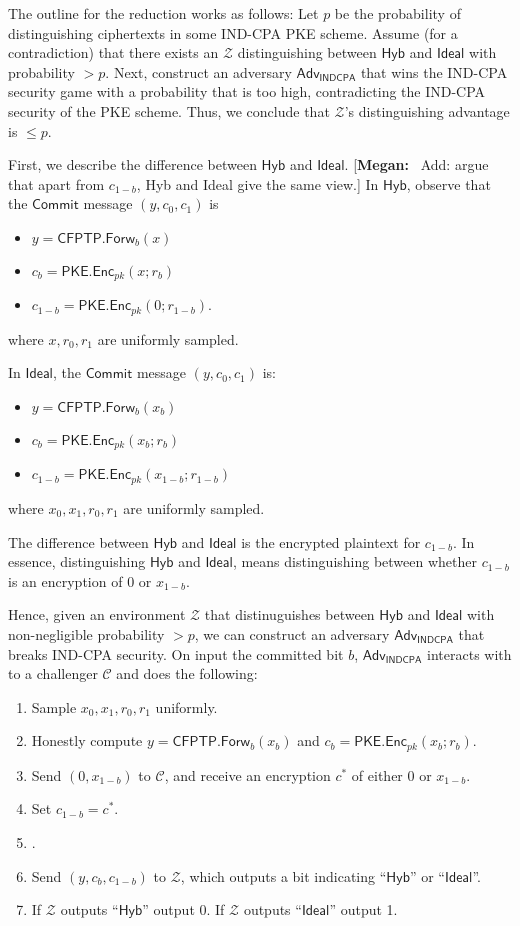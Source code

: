 \documentclass{article}[12pt]
\newcommand{\authnote}[2]{[{\color{red}\textbf{#1:}}~{\color{blue} #2}]}
\newcommand{\authnote}[2]{}
\newcommand{\megan}[1]{\authnote{Megan}{#1}}
\newcommand{\OpenMsg}{\mathsf{Open}}
\newcommand{\CommitMsg}{\mathsf{Commit}}
\newcommand{\PKE}{\mathsf{PKE}}
\newcommand{\Enc}{\mathsf{Enc}}
\newcommand{\Indcpa}{\mathsf{INDCPA}}
\newcommand{\IndcpaGM}{\mathcal{C}} %
\newcommand{\CFPTP}{\mathsf{CFPTP}}
\newcommand{\Forw}{\mathsf{Forw}}
\newcommand{\Adversary}{{\mathsf{Adv}}} %
\newcommand{\Environment}{{\mathcal{Z}}} %
\newcommand{\IndcpaAdversary}{{\Adversary_\Indcpa}}
\newcommand{\Ideal}{{\mathsf{Ideal}}}
\newcommand{\Hyb}{{\mathsf{Hyb}}}
\begin{document}
The outline for the reduction works as follows: Let $p$ be the probability of distinguishing ciphertexts in some IND-CPA PKE scheme. Assume (for a contradiction) that there exists an $\Environment$ distinguishing between $\Hyb$ and $\Ideal$ with probability $> p$. Next, construct an adversary $\IndcpaAdversary$ that wins the IND-CPA security game with a probability that is too high, contradicting the IND-CPA security of the PKE scheme. Thus, we conclude that $\Environment$'s distinguishing advantage is $\leq p$.

First, we describe the difference between $\Hyb$ and $\Ideal$. \megan{Add: argue that apart from $c_{1-b}$, Hyb and Ideal give the same view.}
In $\Hyb$, observe that the $\CommitMsg$ message $(y, c_0, c_1)$ is
\begin{itemize}
	\item $y = \CFPTP.\Forw_{b}(x)$
	\item $c_b = \PKE.\Enc_{pk}(x; r_b)$
	\item $c_{1-b} = \PKE.\Enc_{pk}(0; r_{1-b})$.
\end{itemize}
where $x, r_0, r_1$ are uniformly sampled.

In $\Ideal$, the $\CommitMsg$ message $(y, c_0, c_1)$ is:
\begin{itemize}
	\item $y = \CFPTP.\Forw_{b}(x_b)$
	\item $c_b = \PKE.\Enc_{pk}(x_b; r_b)$
	\item $c_{1-b} = \PKE.\Enc_{pk}(x_{1-b}; r_{1-b})$
\end{itemize}
where $x_0, x_1, r_0, r_1$ are uniformly sampled.

The difference between $\Hyb$ and $\Ideal$ is the encrypted plaintext for $c_{1-b}$. In essence, distinguishing $\Hyb$ and $\Ideal$, means distinguishing between whether $c_{1-b}$ is an encryption of $0$ or $x_{1-b}$.

Hence, given an environment $\Environment$ that distinuguishes between $\Hyb$ and $\Ideal$ with non-negligible probability $>p$, we can construct an adversary $\IndcpaAdversary$ that breaks IND-CPA security. On input the committed bit $b$, $\IndcpaAdversary$ interacts with to a challenger $\IndcpaGM$ and does the following:
\begin{enumerate}
	\item Sample $x_0, x_1, r_0, r_1$ uniformly.
	\item Honestly compute $y = \CFPTP.\Forw_b(x_b)$ and $c_b = \PKE.\Enc_{pk}(x_b; r_b)$.
	\item Send $(0, x_{1-b})$ to $\IndcpaGM$, and receive an encryption $c^*$ of either $0$ or $x_{1-b}$.
	\item Set $c_{1-b} = c^*$.
	\item \megan{Generate the rest of $\Environment$'s view (incl. $\OpenMsg$ message)}.
	\item Send $(y, c_b, c_{1-b})$ to $\Environment$, which outputs a bit indicating ``$\Hyb$'' or ``$\Ideal$''.
	\item If $\Environment$ outputs ``$\Hyb$'' output 0. If $\Environment$ outputs ``$\Ideal$'' output 1.
\end{enumerate}
\end{document}
